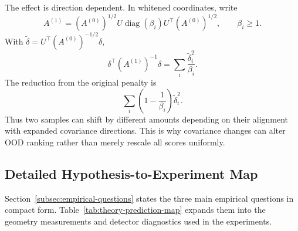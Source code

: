 The effect is direction dependent. In whitened coordinates, write
\[
    A^{(1)}
    =
    (A^{(0)})^{1/2}
    U\operatorname{diag}(\beta_i)U^\top
    (A^{(0)})^{1/2},
    \qquad
    \beta_i\ge 1.
\]
With \(\widetilde{\delta}=U^\top(A^{(0)})^{-1/2}\delta\),
\[
    \delta^\top(A^{(1)})^{-1}\delta
    =
    \sum_i
    \frac{\widetilde{\delta}_i^2}{\beta_i}.
\]
The reduction from the original penalty is
\[
    \sum_i
    \left(1-\frac{1}{\beta_i}\right)
    \widetilde{\delta}_i^2.
\]
Thus two samples can shift by different amounts depending on their alignment
with expanded covariance directions. This is why covariance changes can alter
OOD ranking rather than merely rescale all scores uniformly.

\subsection{Detailed Hypothesis-to-Experiment Map}
\label{app:detailed-hypothesis-map}

Section~\ref{subsec:empirical-questions} states the three main empirical
questions in compact form. Table~\ref{tab:theory-prediction-map} expands them
into the geometry measurements and detector diagnostics used in the experiments.


